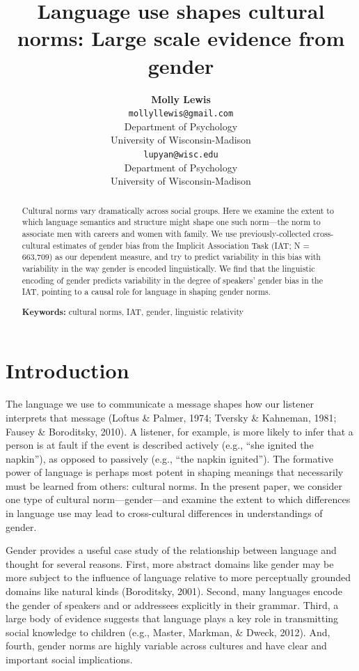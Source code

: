 \documentclass[10pt, letterpaper]{article}
\title{Language use shapes cultural norms: Large scale evidence from gender}
\author{{\large \bf Molly Lewis} \\ \texttt{mollyllewis@gmail.com} \\ Department of Psychology  \\ University of Wisconsin-Madison \And {\large \bf Gary Lupyan} \\ \texttt{lupyan@wisc.edu} \\ Department of Psychology  \\ University of Wisconsin-Madison}
\begin{document}
\maketitle

\begin{abstract}
Cultural norms vary dramatically across social groups. Here we examine
the extent to which language semantics and structure might shape one
such norm---the norm to associate men with careers and women with
family. We use previously-collected cross-cultural estimates of gender
bias from the Implicit Association Task (IAT; N = 663,709) as our
dependent measure, and try to predict variability in this bias with
variability in the way gender is encoded linguistically. We find that
the linguistic encoding of gender predicts variability in the degree of
speakers' gender bias in the IAT, pointing to a causal role for language
in shaping gender norms.

\textbf{Keywords:}
cultural norms, IAT, gender, linguistic relativity
\end{abstract}

\section{Introduction}\label{introduction}

The language we use to communicate a message shapes how our listener
interprets that message (Loftus \& Palmer, 1974; Tversky \& Kahneman,
1981; Fausey \& Boroditsky, 2010). A listener, for example, is more
likely to infer that a person is at fault if the event is described
actively (e.g., ``she ignited the napkin''), as opposed to passively
(e.g., ``the napkin ignited''). The formative power of language is
perhaps most potent in shaping meanings that necessarily must be learned
from others: cultural norms. In the present paper, we consider one type
of cultural norm---gender---and examine the extent to which differences
in language use may lead to cross-cultural differences in understandings
of gender.

Gender provides a useful case study of the relationship between language
and thought for several reasons. First, more abstract domains like
gender may be more subject to the influence of language relative to more
perceptually grounded domains like natural kinds (Boroditsky, 2001).
Second, many languages encode the gender of speakers and or addressees
explicitly in their grammar. Third, a large body of evidence suggests
that language plays a key role in transmitting social knowledge to
children (e.g., Master, Markman, \& Dweck, 2012). And, fourth, gender
norms are highly variable across cultures and have clear and important
social implications.
\end{document}
